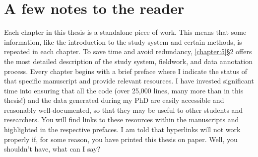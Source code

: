 \section{A few notes to the reader}
Each chapter in this thesis is a standalone piece of work. This means that some information, like the introduction to the study system and certain methods, is repeated in each chapter. To save time and avoid redundancy, \autoref{chapter:5}\S2 offers the most detailed description of the study system, fieldwork, and data annotation process.
Every chapter begins with a brief preface where I indicate the status of that specific manuscript and provide relevant resources. I have invested significant time into ensuring that all the code (over 25,000 lines, many more than in this thesis!) and the data generated during my PhD are easily accessible and reasonably well-documented, so that they may be useful to other students and researchers. You will find links to these resources within the manuscripts and highlighted in the respective prefaces.
I am told that hyperlinks will not work properly if, for some reason, you have printed this thesis on paper. Well, you shouldn't have, what can I say?

\renewcommand{\cleardoublepage}{}
\renewcommand{\clearpage}{}
\printbibliography

